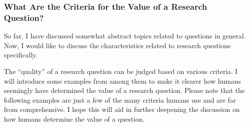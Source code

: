 


\subsubsection{What Are the Criteria for the Value of a Research Question?}

So far, I have discussed somewhat abstract topics related to questions in general. Now, I would like to discuss the characteristics related to research questions specifically. 

The ``quality'' of a research question can be judged based on various criteria. I will introduce some examples from among them to make it clearer how humans seemingly have determined the value of a research question. Please note that the following examples are just a few of the many criteria humans use and are far from comprehensive. I hope this will aid in further deepening the discussion on how humans determine the value of a question.

